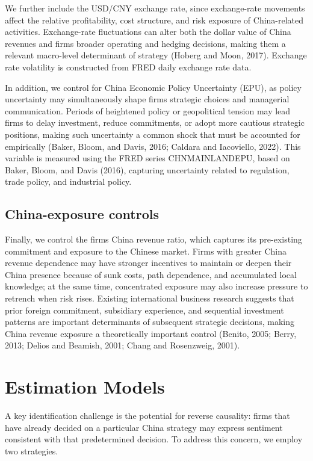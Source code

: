 \documentclass{article}
\begin{document}
We further include the USD/CNY exchange rate, since exchange-rate
movements affect the relative profitability, cost structure, and risk
exposure of China-related activities. Exchange-rate fluctuations can
alter both the dollar value of China revenues and
firms\textquotesingle{} broader operating and hedging decisions, making
them a relevant macro-level determinant of strategy (Hoberg and Moon,
2017). Exchange rate volatility is constructed from FRED daily exchange
rate data.

In addition, we control for China Economic Policy Uncertainty (EPU), as
policy uncertainty may simultaneously shape firms\textquotesingle{}
strategic choices and managerial communication. Periods of heightened
policy or geopolitical tension may lead firms to delay investment,
reduce commitments, or adopt more cautious strategic positions, making
such uncertainty a common shock that must be accounted for empirically
(Baker, Bloom, and Davis, 2016; Caldara and Iacoviello, 2022). This
variable is measured using the FRED series CHNMAINLANDEPU, based on
Baker, Bloom, and Davis (2016), capturing uncertainty related to
regulation, trade policy, and industrial policy.

\subsection{China-exposure controls}\label{china-exposure-controls}

Finally, we control the firm\textquotesingle s China revenue ratio,
which captures its pre-existing commitment and exposure to the Chinese
market. Firms with greater China revenue dependence may have stronger
incentives to maintain or deepen their China presence because of sunk
costs, path dependence, and accumulated local knowledge; at the same
time, concentrated exposure may also increase pressure to retrench when
risk rises. Existing international business research suggests that prior
foreign commitment, subsidiary experience, and sequential investment
patterns are important determinants of subsequent strategic decisions,
making China revenue exposure a theoretically important control (Benito,
2005; Berry, 2013; Delios and Beamish, 2001; Chang and Rosenzweig,
2001).

\section{Estimation Models}\label{estimation-models}

A key identification challenge is the potential for reverse causality:
firms that have already decided on a particular China strategy may
express sentiment consistent with that predetermined decision. To
address this concern, we employ two strategies.
\end{document}
